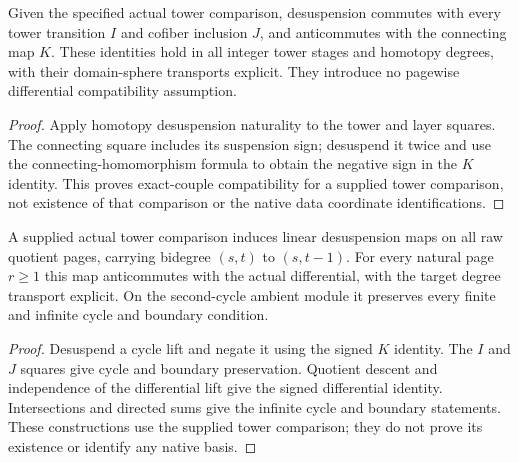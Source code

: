 \begin{lemma}
  \label{lem:adams-suspension-exact-couple}
  \leanok
  Given the specified actual tower comparison, desuspension commutes with
  every tower transition $I$ and cofiber inclusion $J$, and anticommutes
  with the connecting map $K$. These identities hold in all integer tower
  stages and homotopy degrees, with their domain-sphere transports explicit.
  They introduce no pagewise differential compatibility assumption.
\end{lemma}
\begin{proof}
  \leanok
  Apply homotopy desuspension naturality to the tower and layer squares.
  The connecting square includes its suspension sign; desuspend it twice
  and use the connecting-homomorphism formula to obtain the negative sign
  in the $K$ identity. This proves exact-couple compatibility for a supplied
  tower comparison, not existence of that comparison or the native data
  coordinate identifications.
\end{proof}

\begin{lemma}
  \label{lem:adams-suspension-pages}
  \leanok
  A supplied actual tower comparison induces linear desuspension maps on
  all raw quotient pages, carrying bidegree $(s,t)$ to $(s,t-1)$. For every
  natural page $r\geq1$ this map anticommutes with the actual differential,
  with the target degree transport explicit. On the second-cycle ambient
  module it preserves every finite and infinite cycle and boundary condition.
\end{lemma}
\begin{proof}
  \leanok
  Desuspend a cycle lift and negate it using the signed $K$ identity.
  The $I$ and $J$ squares give cycle and boundary preservation. Quotient
  descent and independence of the differential lift give the signed
  differential identity. Intersections and directed sums give the infinite
  cycle and boundary statements. These constructions use the supplied tower
  comparison; they do not prove its existence or identify any native basis.
\end{proof}

